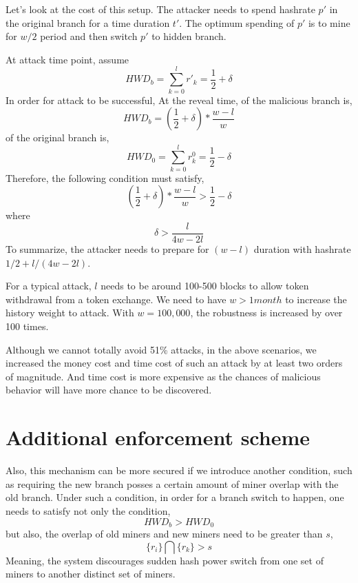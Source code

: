 \documentclass[conference]{IEEEtran}
\begin{document}
Let's look at the cost of this setup. The attacker needs to spend hashrate $p'$ in the original branch for a time duration $t'$. The optimum spending of $p'$ is to mine for $w/2$ period and then switch $p'$ to hidden branch. 

At attack time point, assume
\begin{equation}
    H\!W\!D_b= \sum_{k=0}^{l}r'_k=\frac{1}{2} + \delta\label{eq}
\end{equation}
In order for attack to be successful, At the reveal time,  of the malicious branch is,
\begin{equation}
    H\!W\!D_b= (\frac{1}{2} + \delta) * \frac{w-l}{w}\label{eq}
\end{equation}
 of the original branch is,
\begin{equation}
    H\!W\!D_0 = \sum_{k=0}^{l} r_{k}^{0} =  \frac{1}{2} - \delta\label{eq}
\end{equation}
Therefore, the following condition must satisfy,
\begin{equation}
    (\frac{1}{2} + \delta) * \frac{w-l}{w} > \frac{1}{2}-\delta\label{eq}
\end{equation}
where
\begin{equation}
\delta>\frac{l}{4w-2l}\label{eq}
\end{equation}
To summarize, the attacker needs to prepare for $(w-l)$ duration with hashrate $1/2+l/(4w-2l)$.

For a typical attack, $l$ needs to be around 100-500 blocks to allow token withdrawal from a token exchange. We need to have $w > 1 month$ to increase the history weight to attack. With $w = 100,000$, the robustness is increased by over 100 times. 

Although we cannot totally avoid 51\% attacks, in the above scenarios, we increased the money cost and time cost of such an attack by at least two orders of magnitude. And time cost is more expensive as the chances of malicious behavior will have more chance to be discovered. 


\section{Additional enforcement scheme}

Also, this mechanism can be more secured if we introduce another condition, such as requiring the new branch posses a certain amount of miner overlap with the old branch. Under such a condition, in order for a branch switch to happen, one needs to satisfy not only the  condition,
\begin{equation}
    H\!W\!D_b>H\!W\!D_0\label{eq}
\end{equation} 
but also, the overlap of old miners and new miners need to be greater than $s$,
\begin{equation}
    \{r_i\}\bigcap\{r_k\}>s\label{eq}
\end{equation}
Meaning, the system discourages sudden hash power switch from one set of miners to another distinct set of miners.
\end{document}
